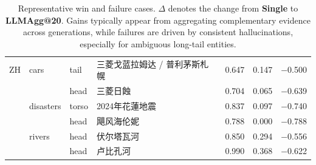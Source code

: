 \documentclass[11pt]{article}
\newcommand{\nega}[1]{\textcolor{red!70!black}{\num{-#1}}}
\begin{document}
\begin{CJK*}{UTF8}{gbsn}
\begin{table}
\begin{tabular}{
l l l l
S
S
l
}
ZH & cars      & tail  & 三菱戈蓝拉姆达 / 普利茅斯札幌   & 0.647 & 0.147 & \nega{0.500} \\
   &           & head  & 三菱日蝕                       & 0.704 & 0.065 & \nega{0.639} \\
   & disasters & torso & 2024年花蓮地震                 & 0.837 & 0.097 & \nega{0.740} \\
   &           & head  & 飓风海伦妮                     & 0.788 & 0.000 & \nega{0.788} \\
   & rivers    & head  & 伏尔塔瓦河                     & 0.850 & 0.294 & \nega{0.556} \\
   &           & head  & 卢比孔河                       & 0.990 & 0.368 & \nega{0.622} \\

\bottomrule
\end{tabular}

\caption{Representative win and failure cases. $\Delta$ denotes the change from \textbf{Single} to \textbf{LLMAgg@20}. Gains typically appear from aggregating complementary evidence across generations, while failures are driven by consistent hallucinations, especially for ambiguous long-tail entities.}
\label{tab:examples}
\end{table}

\ifPDFTeX
  \end{CJK*}
\fi
\end{document}
